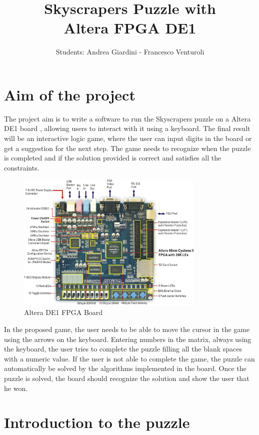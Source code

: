\documentclass[12pt]{report}
\title{Skyscrapers Puzzle with\\
Altera FPGA DE1}
\date{\vspace{-5ex}}
\begin{document}
\author{Students: Andrea Giardini - Francesco Venturoli}
\maketitle

\chapter*{Aim of the project}

The project aim is to write a software to run the Skyscrapers puzzle on
a Altera DE1 board \cite{AlteraDE1Board}, allowing users to interact with
it using a keyboard. The final result will be an interactive logic game,
where the user can input digits in the board or get a suggestion for the
next step. The game needs to recognize when the puzzle is completed and if
the solution provided is correct and satisfies all the constraints.

\begin{figure}[H]
  \centering
  \includegraphics[keepaspectratio,width=0.8\textwidth]{images/Altera_DE1_Board.jpg}
  \caption{Altera DE1 FPGA Board}
\end{figure}

In the proposed game, the user needs to be able to move the cursor in the
game using the arrows on the keyboard. Entering numbers in the matrix, always
using the keyboard, the user tries to complete the puzzle filling all the
blank spaces with a numeric value. If the user is not able to complete the
game, the puzzle can automatically be solved by the algorithms implemented in
the board. Once the puzzle is solved, the board should recognize the
solution and show the user that he won.

\chapter*{Introduction to the puzzle}
\end{document}
